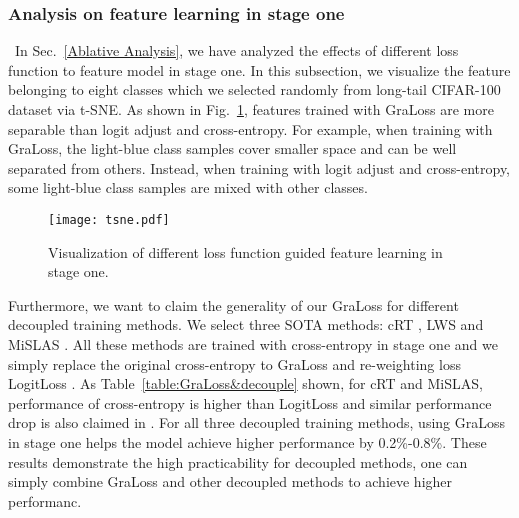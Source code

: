 \documentclass[runningheads]{llncs}
\begin{document}
\subsubsection{Analysis on feature learning in stage one} \ In Sec.~\ref{Ablative Analysis}, we have analyzed the effects of different loss function to feature model in stage one. In this subsection, we visualize the feature belonging to eight classes which we selected randomly from long-tail CIFAR-100 dataset via t-SNE. As shown in Fig.~\ref{fig:tsne}, features trained with GraLoss are more separable than logit adjust \cite{menon2020long} and cross-entropy. For example, when training with GraLoss, the light-blue class samples cover smaller space and can be well separated from others. Instead, when training with logit adjust and cross-entropy, some light-blue class samples are mixed with other classes.
\begin{figure}
\centering
\texttt{[image: tsne.pdf]}
\vspace{-10mm}
\caption{Visualization of different loss function guided feature learning in stage one.}
\label{fig:tsne}
\end{figure}

Furthermore, we want to claim the generality of our GraLoss for different decoupled training methods. We select three SOTA methods: cRT \cite{kang2019decoupling}, LWS \cite{kang2019decoupling} and MiSLAS \cite{zhong2021improving}. All these methods are trained with cross-entropy in stage one and we simply replace the original cross-entropy to GraLoss and re-weighting loss LogitLoss \cite{menon2020long}. As Table~\ref{table:GraLoss&decouple} shown, for cRT and MiSLAS, performance of cross-entropy is higher than LogitLoss and similar performance drop is also claimed in \cite{ren2020balanced}. For all three decoupled training methods, using GraLoss in stage one helps the model achieve higher performance by 0.2\%-0.8\%. These results demonstrate the high practicability for decoupled methods, one can simply combine GraLoss and other decoupled methods to achieve higher performanc.
\end{document}
